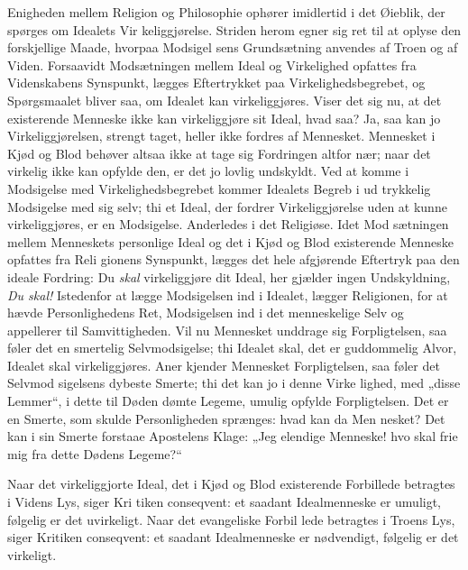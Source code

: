 \documentclass[12pt]{book}
\newcommand{\opage}[1]{\marginnote{\footnotesize\textit{[#1]}}}
\begin{document}
Enigheden mellem Religion og Philosophie ophører
imidlertid i det Øieblik, der spørges om Idealets Vir\-%
keliggjørelse. Striden herom egner sig ret til at
\opage{148}\setcounter{footnote}{0}%
oplyse den forskjellige Maade, hvorpaa Modsigel\-%
sens Grundsætning anvendes af Troen og af Viden.
Forsaavidt Modsætningen mellem Ideal og Virkelighed
opfattes fra Videnskabens Synspunkt, lægges Eftertrykket
paa Virkelighedsbegrebet, og Spørgsmaalet bliver saa,
om Idealet kan virkeliggjøres. Viser det sig nu, at det
existerende Menneske ikke kan virkeliggjøre sit Ideal,
hvad saa? Ja, saa kan jo Virkeliggjørelsen, strengt
taget, heller ikke fordres af Mennesket. Mennesket i
Kjød og Blod behøver altsaa ikke at tage sig Fordringen
altfor nær; naar det virkelig ikke kan opfylde den, er
det jo lovlig undskyldt. Ved at komme i Modsigelse
med Virkelighedsbegrebet kommer Idealets Begreb i ud\-%
trykkelig Modsigelse med sig selv; thi et Ideal, der
fordrer Virkeliggjørelse uden at kunne virkeliggjøres, er
en Modsigelse. Anderledes i det Religiøse. Idet Mod\-%
sætningen mellem Menneskets personlige Ideal og det i
Kjød og Blod existerende Menneske opfattes fra Reli\-%
gionens Synspunkt, lægges det hele afgjørende Eftertryk
paa den ideale Fordring: Du \textit{skal} virkeliggjøre dit Ideal,
her gjælder ingen Undskyldning, \textit{Du skal!} Istedenfor at
lægge Modsigelsen ind i Idealet, lægger Religionen, for
at hævde Personlighedens Ret, Modsigelsen ind i det
menneskelige Selv og appellerer til Samvittigheden. Vil
nu Mennesket unddrage sig Forpligtelsen, saa føler det
en smertelig Selvmodsigelse; thi Idealet skal, det er
guddommelig Alvor, Idealet skal virkeliggjøres. Aner\-%
kjender Mennesket Forpligtelsen, saa føler det Selvmod\-%
sigelsens dybeste Smerte; thi det kan jo i denne Virke\-%
lighed, med „disse Lemmer“, i dette til Døden dømte
Legeme, umulig opfylde Forpligtelsen. Det er en Smerte,
som skulde Personligheden sprænges: hvad kan da Men\-%
nesket? Det kan i sin Smerte forstaae Apostelens Klage:
\opage{149}\setcounter{footnote}{0}%
„Jeg elendige Menneske! hvo skal frie mig fra dette
Dødens Legeme?“

Naar det virkeliggjorte Ideal, det i Kjød og Blod
existerende Forbillede betragtes i Videns Lys, siger Kri\-%
tiken conseqvent: et saadant Idealmenneske er umuligt,
følgelig er det uvirkeligt. Naar det evangeliske Forbil\-%
lede betragtes i Troens Lys, siger Kritiken conseqvent:
et saadant Idealmenneske er nødvendigt, følgelig er det
virkeligt.
\end{document}
